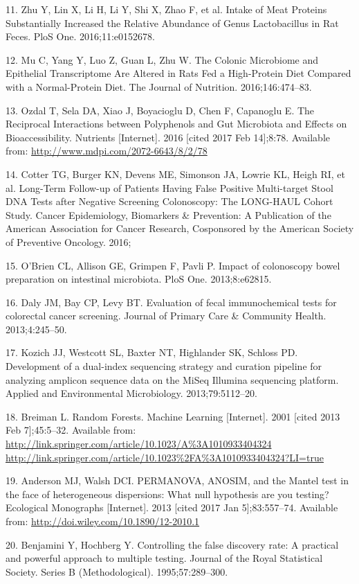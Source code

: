 \documentclass[12pt,]{article}
\begin{document}
\hypertarget{ref-zhu_intake_2016}{}
11. Zhu Y, Lin X, Li H, Li Y, Shi X, Zhao F, et al. Intake of Meat
Proteins Substantially Increased the Relative Abundance of Genus
Lactobacillus in Rat Feces. PloS One. 2016;11:e0152678.

\hypertarget{ref-mu_colonic_2016}{}
12. Mu C, Yang Y, Luo Z, Guan L, Zhu W. The Colonic Microbiome and
Epithelial Transcriptome Are Altered in Rats Fed a High-Protein Diet
Compared with a Normal-Protein Diet. The Journal of Nutrition.
2016;146:474--83.

\hypertarget{ref-ozdal_reciprocal_2016}{}
13. Ozdal T, Sela DA, Xiao J, Boyacioglu D, Chen F, Capanoglu E. The
Reciprocal Interactions between Polyphenols and Gut Microbiota and
Effects on Bioaccessibility. Nutrients {[}Internet{]}. 2016 {[}cited
2017 Feb 14{]};8:78. Available from:
\url{http://www.mdpi.com/2072-6643/8/2/78}

\hypertarget{ref-cotter_long-term_2016}{}
14. Cotter TG, Burger KN, Devens ME, Simonson JA, Lowrie KL, Heigh RI,
et al. Long-Term Follow-up of Patients Having False Positive
Multi-target Stool DNA Tests after Negative Screening Colonoscopy: The
LONG-HAUL Cohort Study. Cancer Epidemiology, Biomarkers \& Prevention: A
Publication of the American Association for Cancer Research, Cosponsored
by the American Society of Preventive Oncology. 2016;

\hypertarget{ref-obrien_impact_2013}{}
15. O'Brien CL, Allison GE, Grimpen F, Pavli P. Impact of colonoscopy
bowel preparation on intestinal microbiota. PloS One. 2013;8:e62815.

\hypertarget{ref-daly_evaluation_2013}{}
16. Daly JM, Bay CP, Levy BT. Evaluation of fecal immunochemical tests
for colorectal cancer screening. Journal of Primary Care \& Community
Health. 2013;4:245--50.

\hypertarget{ref-kozich_development_2013}{}
17. Kozich JJ, Westcott SL, Baxter NT, Highlander SK, Schloss PD.
Development of a dual-index sequencing strategy and curation pipeline
for analyzing amplicon sequence data on the MiSeq Illumina sequencing
platform. Applied and Environmental Microbiology. 2013;79:5112--20.

\hypertarget{ref-breiman_random_2001}{}
18. Breiman L. Random Forests. Machine Learning {[}Internet{]}. 2001
{[}cited 2013 Feb 7{]};45:5--32. Available from:
\href{http://link.springer.com/article/10.1023/A\%3A1010933404324\%20http://link.springer.com/article/10.1023\%2FA\%3A1010933404324?LI=true}{http://link.springer.com/article/10.1023/A\%3A1010933404324 http://link.springer.com/article/10.1023\%2FA\%3A1010933404324?LI=true}

\hypertarget{ref-anderson_permanova_2013}{}
19. Anderson MJ, Walsh DCI. PERMANOVA, ANOSIM, and the Mantel test in
the face of heterogeneous dispersions: What null hypothesis are you
testing? Ecological Monographs {[}Internet{]}. 2013 {[}cited 2017 Jan
5{]};83:557--74. Available from:
\url{http://doi.wiley.com/10.1890/12-2010.1}

\hypertarget{ref-benjamini_controlling_1995}{}
20. Benjamini Y, Hochberg Y. Controlling the false discovery rate: A
practical and powerful approach to multiple testing. Journal of the
Royal Statistical Society. Series B (Methodological). 1995;57:289--300.
\end{document}
